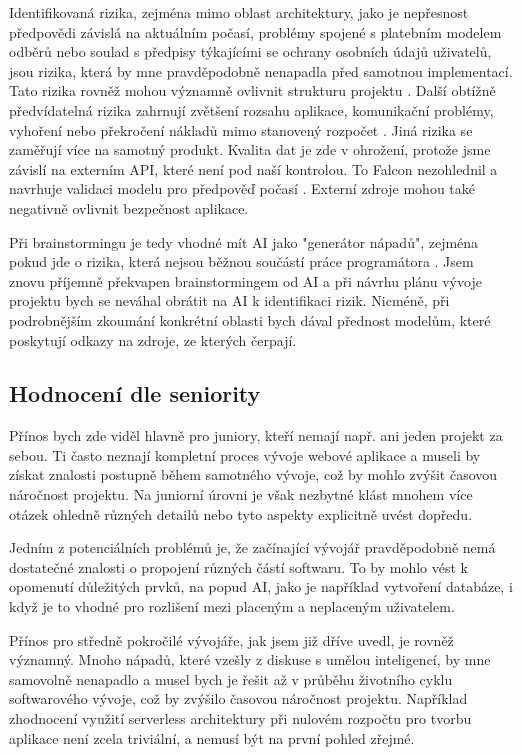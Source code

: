 \documentclass[FM,DP]{tulthesis}
\begin{document}
		Identifikovaná rizika, zejména mimo oblast architektury, jako je nepřesnost předpovědi závislá na aktuálním počasí, problémy spojené s platebním modelem odběrů nebo soulad s předpisy týkajícími se ochrany osobních údajů uživatelů, jsou rizika, která by mne pravděpodobně nenapadla před samotnou implementací. Tato rizika rovněž mohou významně ovlivnit strukturu projektu \cite{chatgpt_analyza}. Další obtížně předvídatelná rizika zahrnují zvětšení rozsahu aplikace, komunikační problémy, vyhoření nebo překročení nákladů mimo stanovený rozpočet \cite{claude_analyza} \cite{bard_analyza}. Jiná rizika se zaměřují více na samotný produkt. Kvalita dat je zde v ohrožení, protože jsme závislí na externím API, které není pod naší kontrolou. To Falcon nezohlednil a navrhuje validaci modelu pro předpověď počasí \cite{falcon_analyza}. Externí zdroje mohou také negativně ovlivnit bezpečnost aplikace. 
		
		Při brainstormingu je tedy vhodné mít AI jako "generátor nápadů", zejména pokud jde o rizika, která nejsou běžnou součástí práce programátora \cite{falcon_analyza} \cite{claude_analyza} \cite{codellama_analyza}. Jsem znovu příjemně překvapen brainstormingem od AI a při návrhu plánu vývoje projektu bych se neváhal obrátit na AI k identifikaci rizik. Nicméně, při podrobnějším zkoumání konkrétní oblasti bych dával přednost modelům, které poskytují odkazy na zdroje, ze kterých čerpají.
		
		\subsection{Hodnocení dle seniority}
		Přínos bych zde viděl hlavně pro juniory, kteří nemají např. ani jeden projekt za sebou. Ti často neznají kompletní proces vývoje webové aplikace a museli by získat znalosti postupně během samotného vývoje, což by mohlo zvýšit časovou náročnost projektu. Na juniorní úrovni je však nezbytné klást mnohem více otázek ohledně různých detailů nebo tyto aspekty explicitně uvést dopředu.
		
		Jedním z potenciálních problémů je, že začínající vývojář pravděpodobně nemá dostatečné znalosti o propojení různých částí softwaru. To by mohlo vést k opomenutí důležitých prvků, na popud AI, jako je například vytvoření databáze, i když je to vhodné pro rozlišení mezi placeným a neplaceným uživatelem.
		
		Přínos pro středně pokročilé vývojáře, jak jsem již dříve uvedl, je rovněž významný. Mnoho nápadů, které vzešly z diskuse s umělou inteligencí, by mne samovolně nenapadlo a musel bych je řešit až v průběhu životního cyklu softwarového vývoje, což by zvýšilo časovou náročnost projektu. Například zhodnocení využití serverless architektury při nulovém rozpočtu pro tvorbu aplikace není zcela triviální, a nemusí být na první pohled zřejmé.
		
\end{document}
